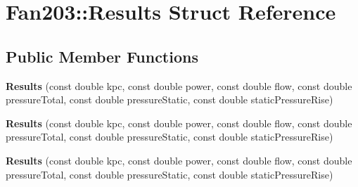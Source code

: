 \hypertarget{struct_fan203_1_1_results}{}\section{Fan203\+:\+:Results Struct Reference}
\label{struct_fan203_1_1_results}
\subsection*{Public Member Functions}
\begin{DoxyCompactItemize}
\item 
\mbox{\label{struct_fan203_1_1_results_ab8d6607214bd63c0dfc8fda57c0783d8}} 
{\bfseries Results} (const double kpc, const double power, const double flow, const double pressure\+Total, const double pressure\+Static, const double static\+Pressure\+Rise)
\item 
\mbox{\label{struct_fan203_1_1_results_ab8d6607214bd63c0dfc8fda57c0783d8}} 
{\bfseries Results} (const double kpc, const double power, const double flow, const double pressure\+Total, const double pressure\+Static, const double static\+Pressure\+Rise)
\item 
\mbox{\label{struct_fan203_1_1_results_ab8d6607214bd63c0dfc8fda57c0783d8}} 
{\bfseries Results} (const double kpc, const double power, const double flow, const double pressure\+Total, const double pressure\+Static, const double static\+Pressure\+Rise)
\end{DoxyCompactItemize}
